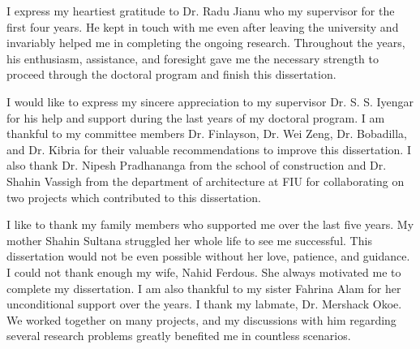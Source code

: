 \begin{acknowledgments}
I express my heartiest gratitude to Dr. Radu Jianu who my supervisor for the first four years. He kept in touch with me even after leaving the university and invariably helped me in completing the ongoing research. Throughout the years, his enthusiasm, assistance, and foresight gave me the necessary strength to proceed through the doctoral program and finish this dissertation. 

I would like to express my sincere appreciation to my supervisor Dr.  S. S. Iyengar for his help and support during the last years of my doctoral program. I am thankful to my committee members Dr. Finlayson, Dr. Wei Zeng, Dr. Bobadilla, and Dr. Kibria for their valuable recommendations to improve this dissertation. I also thank Dr. Nipesh Pradhananga from the school of construction and Dr. Shahin Vassigh from the department of architecture at FIU for collaborating on two projects which contributed to this dissertation.

I like to thank my family members who supported me over the last five years. My mother Shahin Sultana struggled her whole life to see me successful. This dissertation would not be even possible without her love, patience, and guidance.  I could not thank enough my wife, Nahid Ferdous. She always motivated me to complete my dissertation. I am also thankful to my sister Fahrina Alam for her unconditional support over the years.  I thank my labmate, Dr. Mershack Okoe. We worked together on many projects, and my discussions with him regarding several research problems greatly benefited me in countless scenarios. 
\end{acknowledgments}